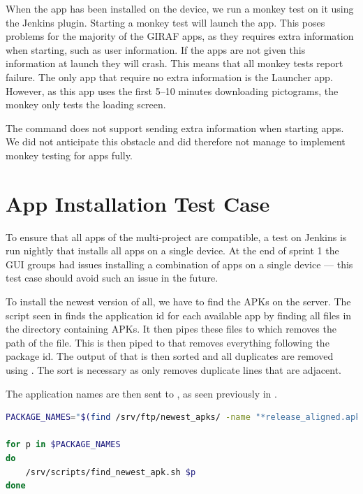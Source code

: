 When the app has been installed on the device, we run a monkey test on it using the Jenkins plugin. Starting a monkey test will launch the app. This poses problems for the majority of the GIRAF apps, as they requires extra information when starting, such as user information. If the apps are not given this information at launch they will crash. This means that all monkey tests report failure. The only app that require no extra information is the Launcher app. However, as this app uses the first 5--10 minutes downloading pictograms, the monkey only tests the loading screen.

The  command does not support sending extra information when starting apps. We did not anticipate this obstacle and did therefore not manage to implement monkey testing for apps fully.


\section{App Installation Test Case}\label{sec:s3_appinstallationtest}
To ensure that all apps of the multi-project are compatible, a test on Jenkins is run nightly that installs all apps on a single device. At the end of sprint 1 the GUI groups had issues installing a combination of apps on a single device --- this test case should avoid such an issue in the future.

To install the newest version of all, we have to find the APKs on the server. The script seen in  finds the application id for each available app by finding all files in the directory containing APKs. It then pipes these files to  which removes the path of the file. This is then piped to  that removes everything following the package id. The output of that is then sorted and all duplicates are removed using . The sort is necessary as  only removes duplicate lines that are adjacent.

The application names are then sent to , as seen previously in .

\begin{lstlisting}[language=bash,showstringspaces=false,caption=Script that finds the newest available APK for all apps,label=lst:find_all_newest_apks]
PACKAGE_NAMES="$(find /srv/ftp/newest_apks/ -name "*release_aligned.apk" | sed 's:.*/::' | sed 's:_v.*::' | sort | uniq)"

for p in $PACKAGE_NAMES
do
    /srv/scripts/find_newest_apk.sh $p
done
\end{lstlisting}

